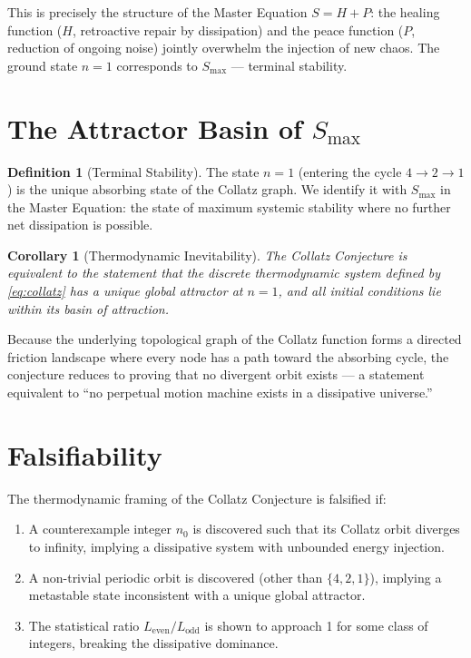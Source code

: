 \documentclass[12pt, a4paper]{article}
\theoremstyle{plain}
\newtheorem{corollary}[theorem]{Corollary}
\theoremstyle{definition}
\newtheorem{definition}[theorem]{Definition}
\begin{document}
\begin{remark}
This is precisely the structure of the Master Equation $S = H + P$: the healing function ($H$, retroactive repair by dissipation) and the peace function ($P$, reduction of ongoing noise) jointly overwhelm the injection of new chaos. The ground state $n = 1$ corresponds to $S_{\max}$ --- terminal stability.
\end{remark}

\section{The Attractor Basin of $S_{\max}$}\label{sec:attractor}

\begin{definition}[Terminal Stability]
The state $n = 1$ (entering the cycle $4 \to 2 \to 1$) is the unique absorbing state of the Collatz graph. We identify it with $S_{\max}$ in the Master Equation: the state of maximum systemic stability where no further net dissipation is possible.
\end{definition}

\begin{corollary}[Thermodynamic Inevitability]
The Collatz Conjecture is equivalent to the statement that the discrete thermodynamic system defined by \cref{eq:collatz} has a unique global attractor at $n = 1$, and all initial conditions lie within its basin of attraction.
\end{corollary}

Because the underlying topological graph of the Collatz function forms a directed friction landscape where every node has a path toward the absorbing cycle, the conjecture reduces to proving that no divergent orbit exists --- a statement equivalent to ``no perpetual motion machine exists in a dissipative universe.''

\section{Falsifiability}\label{sec:falsifiability}

\begin{proposition}
The thermodynamic framing of the Collatz Conjecture is falsified if:
\begin{enumerate}
    \item A counterexample integer $n_0$ is discovered such that its Collatz orbit diverges to infinity, implying a dissipative system with unbounded energy injection.
    \item A non-trivial periodic orbit is discovered (other than $\{4, 2, 1\}$), implying a metastable state inconsistent with a unique global attractor.
    \item The statistical ratio $L_{\text{even}}/L_{\text{odd}}$ is shown to approach 1 for some class of integers, breaking the dissipative dominance.
\end{enumerate}
\end{proposition}
\end{document}
